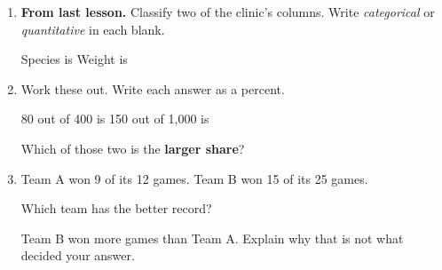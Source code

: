 \documentclass[12pt]{article}
\begin{document}
\begin{enumerate}[leftmargin=1.9em, itemsep=0.34in]

  \item \textbf{From last lesson.} Classify two of the clinic's columns. Write
        \emph{categorical} or \emph{quantitative} in each blank.

        \vspace{10pt}
        \hspace{1.0em} Species is  \hfill Weight is 
        \hspace{1.0em}

  \item Work these out. Write each answer as a percent.
        \vspace{10pt}

        \hspace{1.0em} 80 out of 400 is 
        \hfill
        150 out of 1{,}000 is 
        \hspace{1.0em}
        \vspace{12pt}

        Which of those two is the \textbf{larger share}? 

  \item Team A won 9 of its 12 games. Team B won 15 of its 25 games.

        \vspace{8pt}
        Which team has the better record? 
        \vspace{10pt}

        Team B won more games than Team A. Explain why that is not what decided your
        answer.\\[10pt]
        \\[10pt]

\end{enumerate}
\end{document}

